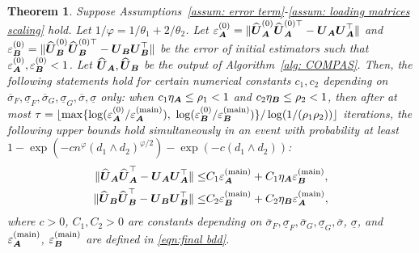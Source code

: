 \documentclass[11pt,letterpaper]{article}
\newtheorem{theorem}{Theorem}[section]
\theoremstyle{definition}
\begin{document}
\begin{theorem}
\label{thm: iteration}
Suppose Assumptions~\ref{assum: error term}-\ref{assum: loading matrices scaling} hold. Let $1/\varphi = 1/\theta_1 + 2/\theta_2$. Let $\varepsilon_{\boldsymbol{A}}^{(0)} = \| \widehat{\boldsymbol{U}}_{\boldsymbol{A}}^{(0)} \widehat{\boldsymbol{U}}_{\boldsymbol{A}}^{(0)\top}  - \boldsymbol{U}_{\boldsymbol{A}} \boldsymbol{U}_{\boldsymbol{A}}^\top \|$ and $\varepsilon_{\boldsymbol{B}}^{(0)} = \|  \widehat{\boldsymbol{U}}_{\boldsymbol{B}}^{(0)} \widehat{\boldsymbol{U}}_{\boldsymbol{B}}^{(0)\top}  - \boldsymbol{U}_{\boldsymbol{B}} \boldsymbol{U}_{\boldsymbol{B}}^\top \|$ be the error of initial estimators such that $\varepsilon_{\boldsymbol{A}}^{(0)}, \varepsilon_{\boldsymbol{B}}^{(0)} < 1$. Let $\widehat {\boldsymbol{U}}_{\boldsymbol{A}}, \widehat {\boldsymbol{U}}_{\boldsymbol{B}}$ be the output of Algorithm~\ref{alg: COMPAS}. 
Then, the following statements hold for certain numerical constants $c_1,c_2$ depending on $\overline{\sigma}_{F}, \underline{\sigma}_{ F},  \overline{\sigma}_{G}, \underline{\sigma}_{G},  \overline{\sigma}, \underline{\sigma}$ only: when $c_1\eta_{\boldsymbol{A}}\le \rho_1 <1 $ and $c_2\eta_{\boldsymbol{B}}\le \rho_2 <1$, then after at most 
$\tau = \lfloor \max\{\log(\varepsilon_{\boldsymbol{A}}^{(0)}/\varepsilon_{\boldsymbol{A}}^{\text{(main)}}),$ $ \log(\varepsilon_{\boldsymbol{B}}^{(0)}/\varepsilon_{\boldsymbol{B}}^{\text{(main)}})\} / \log(1/(\rho_1 \rho_2)) \rfloor$
iterations, the following upper bounds hold simultaneously in an event with probability at least $1- \exp(-cn^{\varphi}(d_1 \wedge d_2)^{\varphi/2})- \exp(-c(d_1 \wedge d_2)) $:
\begin{align}
\| \widehat{\boldsymbol{U}}_{\boldsymbol{A}} \widehat{\boldsymbol{U}}_{\boldsymbol{A}}^\top - \boldsymbol{U}_{\boldsymbol{A}} \boldsymbol{U}_{\boldsymbol{A}}^\top \|
\le & C_1 \varepsilon_{\boldsymbol{A}}^{\text{(main)}} + C_1\eta_{\boldsymbol{A}} \varepsilon_{\boldsymbol{B}}^{\text{(main)}} ,  \label{eqn: refined error bound UA}\\
\|  \widehat{\boldsymbol{U}}_{\boldsymbol{B}} \widehat{\boldsymbol{U}}_{\boldsymbol{B}}^\top  - \boldsymbol{U}_{\boldsymbol{B}} \boldsymbol{U}_{\boldsymbol{B}}^\top \|
\le & C_2 \varepsilon_{\boldsymbol{B}}^{\text{(main)}} + C_2\eta_{\boldsymbol{B}} \varepsilon_{\boldsymbol{A}}^{\text{(main)}} , \label{eqn: refined error bound UB}
\end{align}
where $c>0$, $C_1,C_2>0$ are constants depending on  $\overline{\sigma}_{F}, \underline{\sigma}_{ F}, \overline{\sigma}_{G}, \underline{\sigma}_{G}, \overline{\sigma}$, $\underline{\sigma}$, and $\varepsilon_{\boldsymbol{A}}^{\text{(main)}}$, $ \varepsilon_{\boldsymbol{B}}^{\text{(main)}}$ are defined in \eqref{eqn:final bdd}.
\end{theorem}
\end{document}
